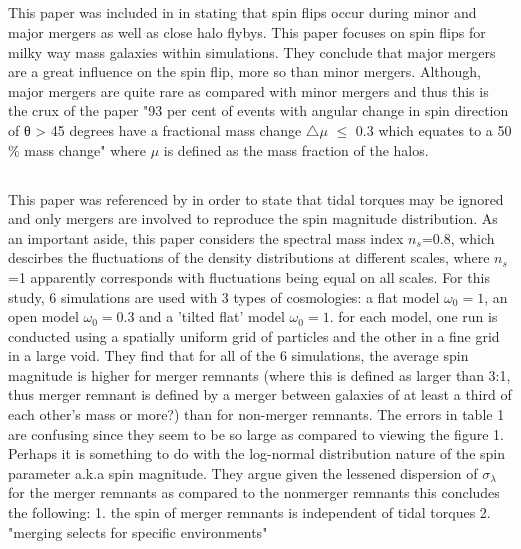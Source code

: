 \documentclass[fleqn,usenatbib]{mnras}
\begin{document}
\subsection{\citet{Bett_Frenk_12}}
This paper was included in \citet{Trowland_13} in stating that spin flips occur during minor and major mergers as well as close halo flybys.
This paper focuses on spin flips for milky way mass galaxies within simulations. They conclude that major mergers are a great influence on the spin flip, more so than minor mergers. Although, major mergers are quite rare as compared with minor mergers and thus this is the crux of the paper "93 per cent of events with angular change in spin direction of θ > 45 degrees have a fractional mass change $\triangle \mu$ $\leq$ 0.3 which equates to a 50 $\%$ mass change" where $\mu$ is defined as the mass fraction of the halos. 

\subsection{\citet{Gardner_01}}
This paper was referenced by \citet{Trowland_13} in order to state that tidal torques may be ignored and only mergers are involved to reproduce the spin magnitude distribution.
As an important aside, this paper considers the spectral mass index $n_{s}$=0.8, which descirbes the fluctuations of the density distributions at different scales, where $n_{s}$=1 apparently corresponds with fluctuations being equal on all scales. For this study, 6 simulations are used with 3 types of cosmologies: a flat model $\omega_{0}=1$, an open model $\omega_{0}=0.3$ and a 'tilted flat' model $\omega_{0}=1$. for each model, one run is conducted using a spatially uniform grid of particles and the other in a fine grid in a large void. 
They find that for all of the 6 simulations, the average spin magnitude is higher for merger remnants (where this is defined as larger than 3:1, thus merger remnant is defined by a merger between galaxies of at least a third of each other's mass or more?) than for non-merger remnants.
The errors in table 1 are confusing since they seem to be so large as compared to viewing the figure 1. Perhaps it is something to do with the log-normal distribution nature of the spin parameter a.k.a spin magnitude. 
They argue given the lessened dispersion of $\sigma_{\lambda}$ for the merger remnants as compared to the nonmerger remnants this concludes the following: 1. the spin of merger remnants is independent of tidal torques 2. "merging selects for specific environments"
\end{document}
